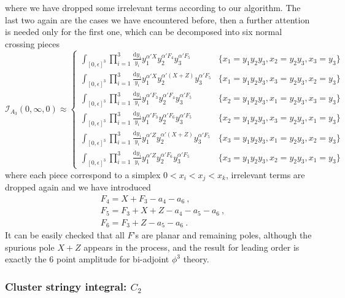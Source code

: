 \documentclass[12pt]{article}
\theoremstyle{definition}
\theoremstyle{plain}
\newcommand{\dif}{\mathrm{d}} %
\begin{document}
where we have dropped some irrelevant terms according to our algorithm. The last two again are the cases we have encountered before, then a further attention is needed only for the first one, which can be decomposed into six normal crossing pieces 
\begin{equation*}
	\mathcal{I}_{A_{3}}(0,\infty,0)\approx
	\begin{cases}
		\int_{[0,\epsilon]^{3}}\prod_{i=1}^{3}\frac{\dif y_{i}}{y_{i}} y_{1}^{\alpha'X} y_{2}^{\alpha' F_{4}}
		y_{3}^{\alpha'F_{5} }  & \{x_{1}=y_{1}y_{2}y_{3}, x_{2}=y_{2}y_{3},x_{3}=y_{3}\} \\
		\int_{[0,\epsilon]^{3}}\prod_{i=1}^{3}\frac{\dif y_{i}}{y_{i}} y_{1}^{\alpha'X} y_{2}^{\alpha' (X+Z)}
		y_{3}^{\alpha'F_{5} }  & \{x_{1}=y_{1}y_{2}y_{3}, x_{3}=y_{2}y_{3},x_{2}=y_{3}\}  \\
		\int_{[0,\epsilon]^{3}}\prod_{i=1}^{3}\frac{\dif y_{i}}{y_{i}} y_{1}^{\alpha' F_{3}} y_{2}^{\alpha' F_{4}}
		y_{3}^{\alpha'F_{5} }  & \{x_{2}=y_{1}y_{2}y_{3}, x_{1}=y_{2}y_{3},x_{3}=y_{3}\}  \\
		\int_{[0,\epsilon]^{3}}\prod_{i=1}^{3}\frac{\dif y_{i}}{y_{i}} y_{1}^{\alpha' F_{3}} y_{2}^{\alpha' F_{6}}
		y_{3}^{\alpha'F_{5} }  & \{x_{2}=y_{1}y_{2}y_{3}, x_{3}=y_{2}y_{3},x_{1}=y_{3}\}  \\
		\int_{[0,\epsilon]^{3}}\prod_{i=1}^{3}\frac{\dif y_{i}}{y_{i}} y_{1}^{\alpha' Z} y_{2}^{\alpha' (X+Z)}
		y_{3}^{\alpha'F_{5} }  & \{x_{3}=y_{1}y_{2}y_{3}, x_{1}=y_{2}y_{3},x_{2}=y_{3}\}  \\
		\int_{[0,\epsilon]^{3}}\prod_{i=1}^{3}\frac{\dif y_{i}}{y_{i}} y_{1}^{\alpha' Z} y_{2}^{\alpha' F_{6}}
		y_{3}^{\alpha'F_{5} }  & \{x_{3}=y_{1}y_{2}y_{3}, x_{2}=y_{2}y_{3},x_{1}=y_{3}\}  
	\end{cases}
\end{equation*}
where each piece correspond to a simplex $0<x_{i}<x_{j}<x_{k}$, irrelevant terms are dropped again and we have introduced
\begin{align*}
	&F_{4}=X+F_{3}-a_{4}-a_{6} \:, \\
	&F_{5}=F_{3}+X+Z-a_{4}-a_{5}-a_{6} \:, \\
	&F_{6}=F_{3}+Z-a_{5}-a_{6} \:.
\end{align*}
It can be easily checked that all $F$'s are planar and remaining poles, although the spurious pole $X+Z$ appears in the process, and the result for leading order is exactly the 6 point amplitude for bi-adjoint $\phi^{3}$ theory.

\subsubsection*{Cluster stringy integral: $C_2$}
\end{document}
